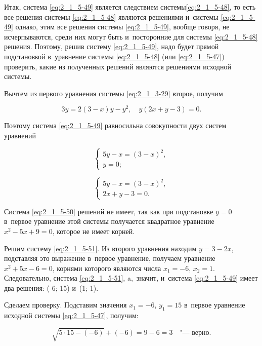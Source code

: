 Итак, система \eqref{eq:2_1_5-49} является следствием системы\eqref{eq:2_1_5-48},
то есть все решения системы \eqref{eq:2_1_5-48} являются решениями
и~системы \eqref{eq:2_1_5-49} однако, этим все решения системы \eqref{eq:2_1_5-49},
вообще говоря, не исчерпываются, среди них могут быть и~посторонние для
системы \eqref{eq:2_1_5-48} решения. Поэтому, решив систему \eqref{eq:2_1_5-49},
надо будет прямой подстановкой в~уравнение системы \eqref{eq:2_1_5-48}
(или \eqref{eq:2_1_5-47}) проверить, какие из полученных решений являются
решениями исходной системы.

Вычтем из первого уравнения системы \eqref{eq:2_1_3-29} второе, получим

\begin{equation*}
3y = 2(3 - x)y - y^{2}, \quad y(2x + y - 3) = 0.
\end{equation*}

Поэтому система \eqref{eq:2_1_5-49} равносильна совокупности двух систем
уравнений

\begin{equation}\label{eq:2_1_5-50}
\begin{cases}
5y - x = (3 - x)^{2}, \\
y = 0;
\end{cases}
\end{equation}

\begin{equation}\label{eq:2_1_5-51}
\begin{cases}
5y - x = (3 - x)^{2}, \\
2x + y - 3 = 0.
\end{cases}
\end{equation}

Система \eqref{eq:2_1_5-50} решений не имеет, так как при подстановке $y = 0$
в~первое уравнение этой системы получается квадратное уравнение
$x^{2} - 5x + 9 = 0$, которое не имеет корней.

Решим систему \eqref{eq:2_1_5-51}. Из второго уравнения находим $y = 3 - 2x$,
подставляя это выражение в~первое уравнение, получаем уравнение
$x^{2} + 5x - 6 = 0$, корнями которого являются числа $x_{1} = -6$, $x_{2} = 1$.
Следовательно, система \eqref{eq:2_1_5-51}, a,~значит, и~система \eqref{eq:2_1_5-49}
имеет два решения: (-6; 15) и~(1; 1).

Сделаем проверку. Подставим значения $x_{1} = -6$, $y_{1} = 15$ в~первое
уравнение исходной системы \eqref{eq:2_1_5-47}, получим:

\begin{equation*}
\sqrt{5 \cdot 15 - (-6)} + (-6) = 9 - 6 = 3 \quad \text{"--- верно}.
\end{equation*}

